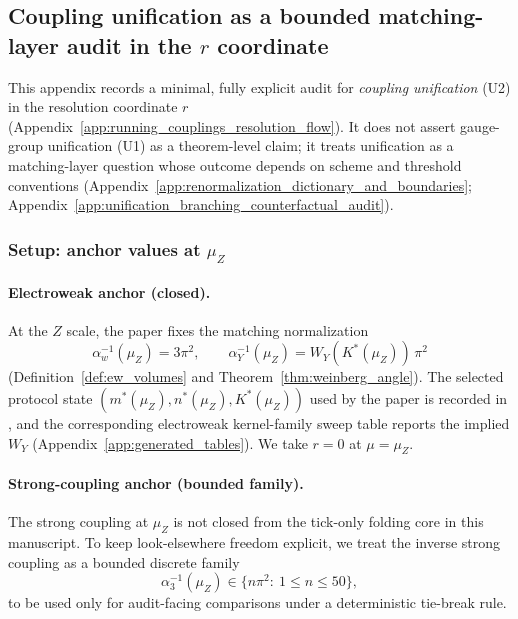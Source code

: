 \subsection{Coupling unification as a bounded matching-layer audit in the $r$ coordinate}
\label{app:coupling_unification_audit_in_r}

This appendix records a minimal, fully explicit \MatchTag{} audit for \emph{coupling unification} (U2) in the resolution coordinate $r$ (Appendix~\ref{app:running_couplings_resolution_flow}).
It does not assert gauge-group unification (U1) as a theorem-level claim; it treats unification as a matching-layer question whose outcome depends on scheme and threshold conventions (Appendix~\ref{app:renormalization_dictionary_and_boundaries}; Appendix~\ref{app:unification_branching_counterfactual_audit}).

\subsubsection{Setup: anchor values at \texorpdfstring{$\mu_Z$}{muZ}}
\paragraph{Electroweak anchor (closed).}
At the $Z$ scale, the paper fixes the matching normalization
\[
\alpha_w^{-1}(\mu_Z)=3\pi^2,\qquad
\alpha_Y^{-1}(\mu_Z)=W_Y(K^\ast(\mu_Z))\,\pi^2
\]
(Definition~\ref{def:ew_volumes} and Theorem~\ref{thm:weinberg_angle}).
The selected protocol state $(m^\ast(\mu_Z),n^\ast(\mu_Z),K^\ast(\mu_Z))$ used by the paper is recorded in , and the corresponding electroweak kernel-family sweep table reports the implied $W_Y$ (Appendix~\ref{app:generated_tables}).
We take $r=0$ at $\mu=\mu_Z$.

\paragraph{Strong-coupling anchor (bounded family).}
\MatchTag The strong coupling at $\mu_Z$ is not closed from the tick-only folding core in this manuscript.
To keep look-elsewhere freedom explicit, we treat the inverse strong coupling as a bounded discrete family
\begin{equation}
\label{eq:alpha3_pi2_family}
\alpha_3^{-1}(\mu_Z)\in\{n\pi^2:\ 1\le n\le 50\},
\end{equation}
to be used only for audit-facing comparisons under a deterministic tie-break rule.

